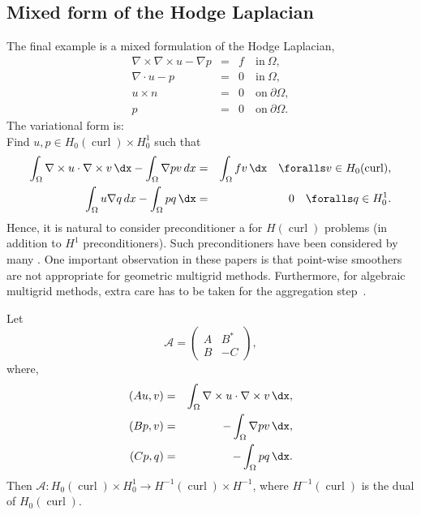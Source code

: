 \subsection{Mixed form of the Hodge Laplacian}
The final example is a mixed formulation
of the Hodge Laplacian,
\begin{eqnarray}
\nabla \times \nabla \times u - \nabla p &=& f \quad \mbox{in} \ \Omega,    \label{mixed:hodge1} \\
\nabla \cdot u -p &=&  0 \quad \mbox{in} \ \Omega, \label{mixed:hodge2} \\
             u \times n &=&  0 \quad \mbox{on} \ \partial \Omega, \\
             p          &=&  0 \quad \mbox{on} \ \partial \Omega.
\end{eqnarray}
The variational form is: \\
Find $u, p \in H_0(\operatorname{curl}) \times H^1_0$ such that
\begin{eqnarray}
\int_\Omega \nabla \times u \cdot \nabla \times v \, \dx
- \int_\Omega \nabla p v \, dx  &=& \int_\Omega f v \, \dx  \quad \foralls v \in H_0(\operatorname{curl}), \\
 \int_\Omega u  \nabla q  \, dx - \int_\Omega p q \, \dx   &=& 0 \quad
 \foralls q \in H^1_0 .
\end{eqnarray}
Hence, it is natural to consider preconditioner a for
$H(\operatorname{curl})$ problems (in addition to $H^1$
preconditioners). Such preconditioners have been considered by many
\citep{ArnoldFalkWinther1997a,ArnoldFalkWinther2000,Hiptmair1997,Hiptmair1999}.
One important observation in these papers is that point-wise smoothers
are not appropriate for geometric multigrid methods. Furthermore, for
algebraic multigrid methods, extra care has to be taken for the
aggregation
step~\citep{GeeSiefertHuEtAl2006,HuTuminaroBochevEtAl2006}.

Let
\[
\mathcal{A}  =
\begin{pmatrix} A & B^* \\ B & -C \end{pmatrix},
\]
where,
\begin{eqnarray}
(A u, v) &=& \int_\Omega \nabla \times u \cdot \nabla \times v \, \dx, \\
(B p, v) &=&  - \int_\Omega \nabla p v \, \dx, \\
(C p, q) &=&  - \int_\Omega p q \, \dx.
\end{eqnarray}
Then $\mathcal{A}: H_0(\operatorname{curl}) \times H^1_0 \rightarrow
H^{-1}(\operatorname{curl}) \times H^{-1}$, where
$H^{-1}(\operatorname{curl})$ is the dual of
$H_0(\operatorname{curl})$.

